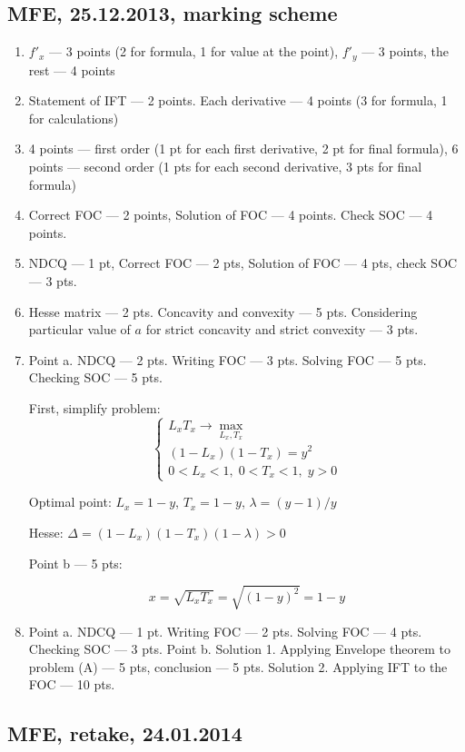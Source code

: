 \documentclass[12pt]{article} %
\theoremstyle{definition} %
\begin{document}
\subsection{MFE, 25.12.2013, marking scheme}

\begin{enumerate}
\item $f'_x$ --- 3 points (2 for formula, 1 for value at  the point), $f'_y$ --- 3 points, the rest --- 4 points
\item Statement of IFT --- 2 points. Each derivative --- 4 points (3 for formula, 1 for calculations)
\item 4 points --- first order (1 pt for each first derivative, 2 pt for final formula), 6 points --- second order (1 pts for each second derivative, 3 pts for final formula)
\item Correct FOC --- 2 points, Solution of FOC --- 4 points. Check SOC --- 4 points.
\item NDCQ --- 1 pt, Correct FOC --- 2 pts, Solution of FOC --- 4 pts, check SOC --- 3 pts.
\item Hesse matrix --- 2 pts. Concavity and convexity --- 5 pts. Considering particular value of $a$ for strict concavity and strict convexity --- 3  pts.

\item Point a. NDCQ --- 2 pts. Writing FOC --- 3 pts. Solving FOC --- 5 pts. Checking SOC --- 5 pts.

First, simplify problem:
\[
\begin{cases}
L_xT_x \to \max_{L_x, T_x} \\
(1-L_x)(1-T_x)=y^2 \\
0<L_x<1, \; 0<T_x<1, \; y>0
\end{cases}
\]

Optimal point: $L_x=1-y$, $T_x=1-y$, $\lambda = (y-1)/y$

Hesse: $\Delta = (1-L_x)(1-T_x)(1-\lambda)>0$

Point b --- 5 pts:

\[
x=\sqrt{L_x T_x}=\sqrt{(1-y)^2}=1-y
\]


\item  Point a. NDCQ --- 1 pt. Writing FOC --- 2 pts. Solving FOC --- 4 pts. Checking SOC --- 3 pts. Point b. Solution 1. Applying Envelope theorem to problem (A) --- 5 pts, conclusion --- 5 pts. Solution 2. Applying IFT to the FOC --- 10 pts.

\end{enumerate}

\subsection{MFE, retake, 24.01.2014}
\end{document}
